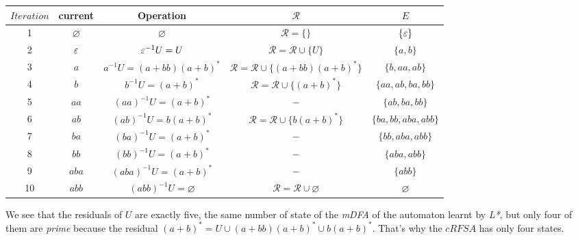 \begin{tabular}{c|c|c|c|c}
  $Iteration$ & current       & Operation                   & $\mathcal{R}$                                      & $E$                    \\
  \hline\hline
  1           & $\varnothing$ & $\varnothing$               & $\mathcal{R} = \{\}$                               & $\{\varepsilon\}$               \\
  2           & $\varepsilon$          & $\varepsilon^{-1}U = U$              & $\mathcal{R} = \mathcal{R} \cup \{U\}$             & $\{a, b\}$             \\
  3           & $a$           & $a^{-1}U = (a+bb)(a+b)^*$   & $\mathcal{R} = \mathcal{R} \cup \{(a+bb)(a+b)^*\}$ & $\{b, aa, ab\}$        \\
  4           & $b$           & $b^{-1}U = (a+b)^*$         & $\mathcal{R} = \mathcal{R} \cup \{(a+b)^*\}$       & $\{aa, ab, ba, bb\}$   \\
  5           & $aa$          & $(aa)^{-1}U = (a+b)^*$      & $-$                                                & $\{ab, ba, bb\}$       \\
  6           & $ab$          & $(ab)^{-1}U = b(a+b)^*$     & $\mathcal{R} = \mathcal{R} \cup \{b(a+b)^*\}$      & $\{ba, bb, aba, abb\}$ \\
  7           & $ba$          & $(ba)^{-1}U = (a+b)^*$      & $-$                                                & $\{bb, aba, abb\}$     \\
  8           & $bb$          & $(bb)^{-1}U = (a+b)^*$      & $-$                                                & $\{aba, abb\}$         \\
  9           & $aba$         & $(aba)^{-1}U = (a+b)^*$     & $-$                                                & $\{abb\}$              \\
  10          & $abb$         & $(abb)^{-1}U = \varnothing$ & $\mathcal{R} = \mathcal{R} \cup {\varnothing}$     & $\varnothing$          \\
\end{tabular}

We see that the residuals of $U$ are exactly five, the same number of state of the \textit{mDFA} of the automaton learnt by \textit{L*}, but only four of them are \textit{prime} because the residual $(a+b)^* = U \cup (a+bb)(a+b)^* \cup b(a+b)^*$. That's why the $cRFSA$ has only four states.